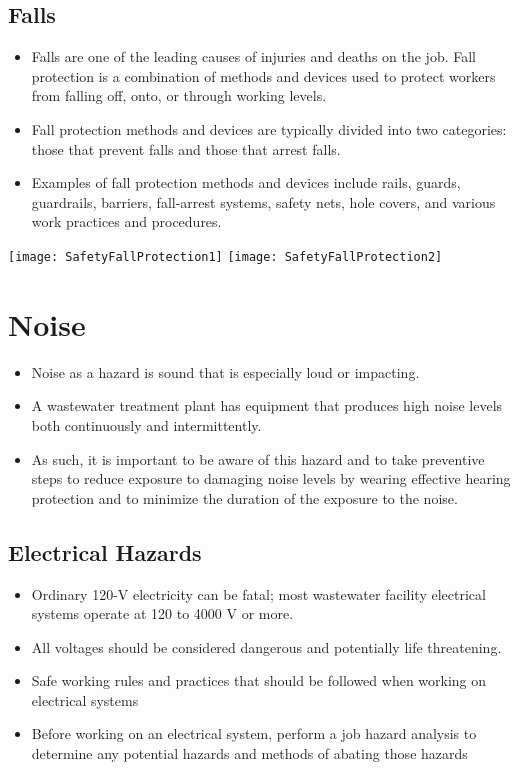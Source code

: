 \documentclass{article}
\begin{document}
\subsection{Falls}
\begin{itemize}
\item Falls are one of the leading causes of injuries and deaths on the job.  Fall protection is a combination of methods and devices used to protect workers from falling off, onto, or through working levels. 
\item Fall protection methods and devices are typically divided into two categories: those that prevent falls and those that arrest falls. 
\item Examples of fall protection methods and devices include rails, guards, guardrails, barriers, fall-arrest systems, safety nets, hole covers, and various work practices and procedures.
\end{itemize}
\begin{center}
\texttt{[image: SafetyFallProtection1]}\hspace{1cm} \texttt{[image: SafetyFallProtection2]}\\
\end{center}
\section{Noise}
\begin{itemize}
\item Noise as a hazard is sound that is especially loud or impacting. 
\item A wastewater treatment plant has equipment that produces high noise levels both continuously and intermittently. 
\item As such, it is important to be aware of this hazard and to take preventive steps to reduce exposure to damaging noise levels by wearing effective hearing protection and to minimize the duration of the exposure to the noise.
\end{itemize}

\subsection{Electrical Hazards}
\begin{itemize}
\item Ordinary 120-V electricity can be fatal; most wastewater facility electrical systems operate at 120 to 4000 V or more.  
\item All voltages should be considered dangerous and potentially life threatening.  
\item Safe working rules and practices that should be followed when working on electrical systems
\item Before working on an electrical system, perform a job hazard analysis to determine any potential hazards and methods of abating those hazards
\end{itemize}
\end{document}
